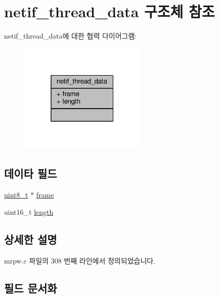 \hypertarget{structnetif__thread__data}{}\section{netif\+\_\+thread\+\_\+data 구조체 참조}
\label{structnetif__thread__data}


netif\+\_\+thread\+\_\+data에 대한 협력 다이어그램\+:
\nopagebreak
\begin{figure}[H]
\begin{center}
\leavevmode
\includegraphics[width=172pt]{structnetif__thread__data__coll__graph}
\end{center}
\end{figure}
\subsection*{데이타 필드}
\begin{DoxyCompactItemize}
\item 
\hyperlink{stdint_8h_aba7bc1797add20fe3efdf37ced1182c5}{uint8\+\_\+t} $\ast$ \hyperlink{structnetif__thread__data_af2e8f7e8583d0d7c40fe4ea5620f857e}{frame}
\item 
uint16\+\_\+t \hyperlink{structnetif__thread__data_a1892eba2086d12ac2b09005aeb09ea3b}{length}
\end{DoxyCompactItemize}


\subsection{상세한 설명}


mrpw.\+c 파일의 308 번째 라인에서 정의되었습니다.



\subsection{필드 문서화}

